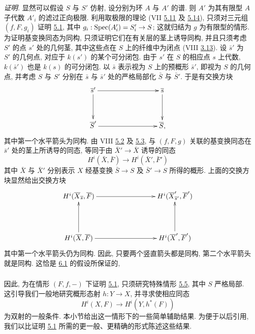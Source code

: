 \noindent
\emph{证明.} 显然可以假设 $S$ 与 $S'$ 仿射, 设分别为环 $A$ 与 $A'$ 的谱. 则 $A'$ 为其有限型 $A$ 子代数 $A'_i$ 的滤过正向极限. 利用取极限的理论 (VII \hyperref[VII.cor5.11]{5.11} 及 \hyperref[VII.rem5.14]{5.14}), 只须对三元组 $(f,F,g_i)$ 证明 \hyperref[XII.thm5.1]{5.1}, 其中 $g_i:\Spec(A'_i)=S'_i\to S$; 这就归结为 $g$ 为有限型的情形. 为证明基变换同态为同构, 只须证明它们在有关层的茎上诱导同构, 并且只须考虑 $S'$ 的点 $s'$ 处的几何茎, 其中这些点在 $S$ 上的纤维中为闭点 (VIII \hyperref[VIII.rem3.13]{3.13}). 设 $\bar s'$ 为 $S'$ 的几何点, 对应于 $k(s')$ 的某个可分闭包. 由于 $s'$ 在 $S$ 的相应点 $s$ 上代数, $k(\bar s')$ 也是 $k(s)$ 的可分闭包. 以 $\bar s$ 表示视为 $S$ 上的预概形 $\bar s'$, 即视为 $S$ 的几何点, 并考虑 $S$ 与 $S'$ 分别在 $\bar s$ 与 $\bar s'$ 处的严格局部化 $\bar S$ 与 $\bar S'$. 于是有交换方块
$$
\vcenter{
\xymatrix@C=3cm@R=1.25cm{
\bar{s}'  \ar[r] \ar[d]& \bar{s}\ar[d]\\
\bar{S}'  \ar[r] &  \bar{S},
}}
$$
其中第一个水平箭头为同构. 由 VIII \hyperref[VIII.thm5.2]{5.2} 及 \hyperref[VIII.rem5.3]{5.3}, 与 $(f,F,g)$ 关联的基变换同态在 $\bar s'$ 处的茎上所诱导的同态, 等同于由 $\bar X'\to\bar X$ 诱导\pageoriginale 的同态
$$
H^{i}(\bar{X},\bar{F})\longrightarrow H^{i}(\bar{X}',\bar{F}')
$$
其中 $\bar X$ 与 $\bar X'$ 分别表示 $X$ 经基变换 $\bar S\to S$ 及 $\bar S'\to S$ 所得的概形. 上面的交换方块显然给出交换方块
$$
\xymatrix@C=3cm@R=1.5cm{
H^{i}(\bar{X}_{\bar{s}}, \bar{F}) \ar[r]&
H^{i}(\bar{X}'_{\bar{s}'},\bar{F}')\\
H^{i}(\bar{X},\bar{F})  \ar[r] \ar[u]&
H^{i}(\bar{X}',\bar{F}') \ar[u],
}
$$
其中第一个水平箭头仍为同构. 因此, 只要两个竖直箭头都是同构, 第二个水平箭头就是同构. 这恰是 \hyperref[XII.lem6.1]{6.1} 的假设所保证的, \cqfd

\setcounter{subsection}{1}
\subsubsection{}
因此, 为在情形 $(F,f,-)$ 下证明 \hyperref[XII.thm5.1]{5.1}, 只须研究特殊情形 \hyperref[XII.cor5.5]{5.5}, 其中 $S$ 严格局部. 这引导我们一般地研究概形态射 $h:Y\to X$, 并寻求使相应同态
$$
H^{i}(X,F)\longrightarrow H^{i}(Y,h^{\ast}(F))
$$
为双射的一般条件. 本小节给出这一情形下的一些简单辅助结果. 为便于以后引用, 我们以比证明 \hyperref[XII.thm5.1]{5.1} 所需的更一般、更精确的形式陈述这些结果.

